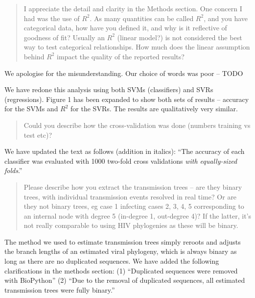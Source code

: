 \documentclass[12pt]{letter}
\begin{document}
\begin{letter}{ }
\begin{quote}
  \itshape

  I appreciate the detail and clarity in the Methods section. One concern I had
  was the use of $R^2$. As many quantities can be called $R^2$, and you have
  categorical data, how have you defined it, and why is it reflective of
  goodness of fit? Usually an $R^2$ (linear model?) is not considered the best
  way to test categorical relationships. How much does the linear assumption
  behind $R^2$ impact the quality of the reported results?
\end{quote}

We apologise for the misunderstanding. Our choice of words was poor -- TODO

We have redone this analysis using both SVMs (classifiers) and SVRs
(regressions). Figure 1 has been expanded to show both sets of results --
accuracy for the SVMs and $R^2$ for the SVRs. The results are qualitatively
very similar.

\begin{quote}
  \itshape

  Could you describe how the cross-validation was done (numbers training vs test etc)?
\end{quote}

We have updated the text as follows (addition in italics): ``The accuracy of
each classifier was evaluated with 1000 two-fold cross validations \emph{with
equally-sized folds}.''

\begin{quote}
  \itshape

  Please describe how you extract the transmission trees -- are they binary
  trees, with individual transmission events resolved in real time? Or are they
  not binary trees, eg case 1 infecting cases 2, 3, 4, 5 corresponding to an
  internal node with degree 5 (in-degree 1, out-degree 4)? If the latter, it's
  not really comparable to using HIV phylogenies as these will be binary.
\end{quote}

The method we used to estimate transmission trees simply reroots and adjusts
the branch lengths of an estimated viral phylogeny, which is always binary as
long as there are no duplicated sequences. We have added the following
clarifications in the methods section: (1) ``Duplicated sequences were removed
with BioPython'' (2) ``Due to the removal of duplicated sequences, all
estimated transmission trees were fully binary.''

\begin{quote}
  \itshape


\end{quote}
\end{letter}
\end{document}
